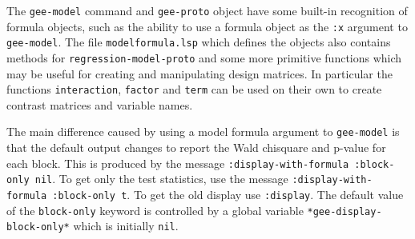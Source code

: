 \documentclass[10pt]{article}
\begin{document}
The \texttt{gee-model} command and \texttt{gee-proto} object have some built-in recognition of formula objects, such as the ability to use a formula object as the \texttt{:x} argument to \texttt{gee-model}. The file \texttt{modelformula.lsp} which defines the objects also contains methods for \texttt{regression\--model-proto} and some  more primitive functions which may be useful for creating and manipulating design matrices. In particular the functions \texttt{interaction}, \texttt{factor} and \texttt{term} can be used on their own to create contrast matrices and variable names.

The main difference caused by using a model formula argument to \texttt{gee-model} is that the default output changes to report  the Wald chisquare and p-value for each block. This is produced by the message \texttt{:display-with-formula :block-only nil}. To get only the test statistics, use the message \texttt{:display-with-formula :block-only t}. To get the old display use \texttt{:display}. The default value of the \texttt{block-only} keyword is controlled by a global variable \verb=*gee-display-block-only*= which is initially \texttt{nil}.
\end{document}
